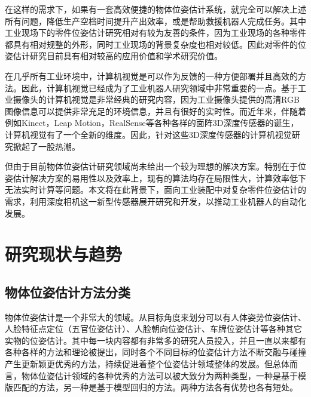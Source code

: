 在这样的需求下，如果有一套高效便捷的物体位姿估计系统，就完全可以解决上述所有问题，降低生产空档时间提升产出效率，或是帮助救援机器人完成任务。其中工业现场下的零件位姿估计研究相对有较为友善的条件，因为工业现场的各种零件都具有相对规整的外形，同时工业现场的背景复杂度也相对较低。因此对零件的位姿估计研究目前具有相对较高的应用价值和学术研究价值。

在几乎所有工业环境中，计算机视觉是可以作为反馈的一种方便部署并且高效的方法。因此，计算机视觉已经成为了工业机器人研究领域中非常重要的一点。基于工业摄像头的计算机视觉是非常经典的研究内容，因为工业摄像头提供的高清RGB图像信息可以提供非常充足的环境信息，并且有很好的实时性。而近年来，伴随着例如Kinect，Leap Motion，RealSense等各种各样的面阵3D深度传感器的诞生，计算机视觉有了一个全新的维度。因此，针对这些3D深度传感器的计算机视觉研究掀起了一股热潮。

但由于目前物体位姿估计研究领域尚未给出一个较为理想的解决方案。特别在于位姿估计解决方案的易用性以及效率上，现有的算法均存在局限性大，计算效率低下无法实时计算等问题。本文将在此背景下，面向工业装配中对复杂零件位姿估计的需求，利用深度相机这一新型传感器展开研究和开发，以推动工业机器人的自动化发展。


\section{研究现状与趋势} 

\subsection{物体位姿估计方法分类} %


物体位姿估计是一个非常大的领域。从目标角度来划分可以有人体姿势位姿估计、人脸特征点定位（五官位姿估计）、人脸朝向位姿估计、车牌位姿估计等各种其它实物的位姿估计。其中每一块内容都有非常多的研究人员投入，并且一直以来都有各种各样的方法和理论被提出，同时各个不同目标的位姿估计方法不断交融与碰撞产生更新颖更优秀的方法，持续促进着整个位姿估计领域整体的发展。但总体而言，物体位姿估计领域的各种优秀的方法可以被大致分为两种类型，一种是基于模版匹配的方法，另一种是基于模型回归的方法。两种方法各有优势也各有短处。

